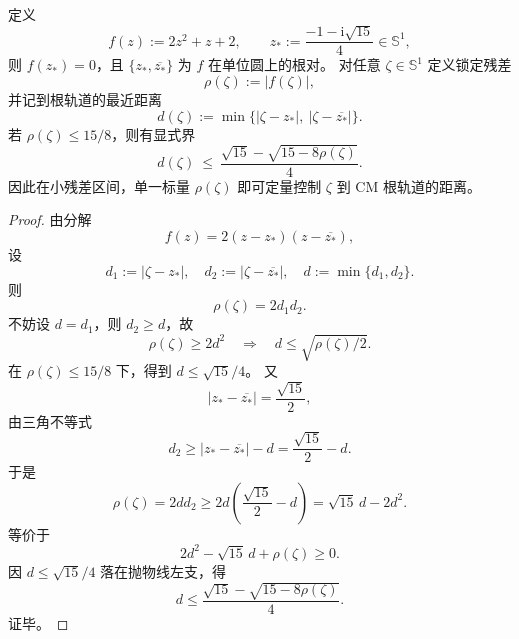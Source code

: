 \begin{proposition}[CM 相位锁定的单标量可逆压缩]\label{prop:xi-cm-phase-lock-single-scalar-recoverability}
定义
\[
f(z):=2z^2+z+2,\qquad
z_\ast:=\frac{-1-\mathrm{i}\sqrt{15}}{4}\in\mathbb S^1,
\]
则 \(f(z_\ast)=0\)，且 \(\{z_\ast,\overline{z_\ast}\}\) 为 \(f\) 在单位圆上的根对。
对任意 \(\zeta\in\mathbb S^1\) 定义锁定残差
\[
\rho(\zeta):=|f(\zeta)|,
\]
并记到根轨道的最近距离
\[
d(\zeta):=\min\{|\zeta-z_\ast|,\ |\zeta-\overline{z_\ast}|\}.
\]
若 \(\rho(\zeta)\le 15/8\)，则有显式界
\[
d(\zeta)\ \le\
\frac{\sqrt{15}-\sqrt{15-8\rho(\zeta)}}{4}.
\]
因此在小残差区间，单一标量 \(\rho(\zeta)\) 即可定量控制 \(\zeta\) 到 CM 根轨道的距离。
\end{proposition}
\begin{proof}
由分解
\[
f(z)=2(z-z_\ast)(z-\overline{z_\ast}),
\]
设
\[
d_1:=|\zeta-z_\ast|,\quad d_2:=|\zeta-\overline{z_\ast}|,\quad d:=\min\{d_1,d_2\}.
\]
则
\[
\rho(\zeta)=2d_1d_2.
\]
不妨设 \(d=d_1\)，则 \(d_2\ge d\)，故
\[
\rho(\zeta)\ge 2d^2\quad\Rightarrow\quad d\le \sqrt{\rho(\zeta)/2}.
\]
在 \(\rho(\zeta)\le 15/8\) 下，得到 \(d\le \sqrt{15}/4\)。
又
\[
|z_\ast-\overline{z_\ast}|=\frac{\sqrt{15}}{2},
\]
由三角不等式
\[
d_2\ge |z_\ast-\overline{z_\ast}|-d=\frac{\sqrt{15}}{2}-d.
\]
于是
\[
\rho(\zeta)=2dd_2
\ge 2d\left(\frac{\sqrt{15}}{2}-d\right)
=\sqrt{15}\,d-2d^2.
\]
等价于
\[
2d^2-\sqrt{15}\,d+\rho(\zeta)\ge 0.
\]
因 \(d\le\sqrt{15}/4\) 落在抛物线左支，得
\[
d\le
\frac{\sqrt{15}-\sqrt{15-8\rho(\zeta)}}{4}.
\]
证毕。
\end{proof}

\endinput
